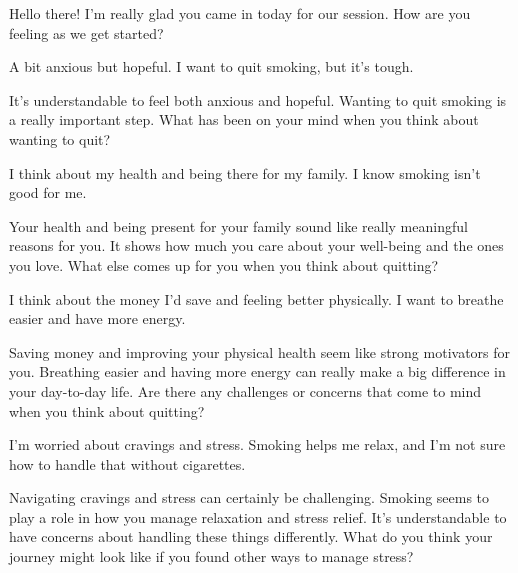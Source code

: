 \begin{counsellorbox}
	Hello there! I'm really glad you came in today for our session. How are you feeling as we get started?
\end{counsellorbox}

\begin{clientbox}
	A bit anxious but hopeful. I want to quit smoking, but it's tough.
\end{clientbox}

\begin{counsellorbox}
	It’s understandable to feel both anxious and hopeful. Wanting to quit smoking is a really important step. What has been on your mind when you think about wanting to quit?
\end{counsellorbox}

\begin{clientbox}
	I think about my health and being there for my family. I know smoking isn't good for me.
\end{clientbox}

\begin{counsellorbox}
	Your health and being present for your family sound like really meaningful reasons for you. It shows how much you care about your well-being and the ones you love. What else comes up for you when you think about quitting?
\end{counsellorbox}

\begin{clientbox}
	I think about the money I'd save and feeling better physically. I want to breathe easier and have more energy.
\end{clientbox}

\begin{counsellorbox}
	Saving money and improving your physical health seem like strong motivators for you. Breathing easier and having more energy can really make a big difference in your day-to-day life. Are there any challenges or concerns that come to mind when you think about quitting?
\end{counsellorbox}

\begin{clientbox}
	I'm worried about cravings and stress. Smoking helps me relax, and I'm not sure how to handle that without cigarettes.
\end{clientbox}

\begin{counsellorbox}
	Navigating cravings and stress can certainly be challenging. Smoking seems to play a role in how you manage relaxation and stress relief. It's understandable to have concerns about handling these things differently. What do you think your journey might look like if you found other ways to manage stress?
\end{counsellorbox}

